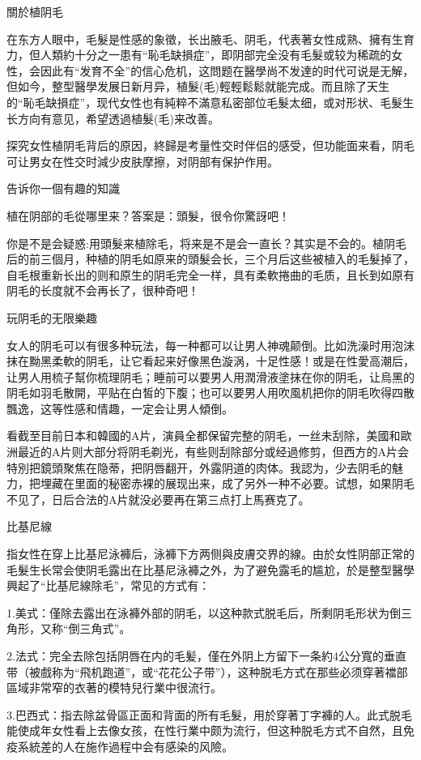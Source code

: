 \documentclass[12pt,UTF8]{ctexbook}
\begin{document}
關於植阴毛

在东方人眼中，毛髮是性感的象徵，长出腋毛、阴毛，代表著女性成熟、擁有生育力，但人類約十分之一患有“恥毛缺損症”，即阴部完全没有毛髮或较为稀疏的女性，会因此有“发育不全”的信心危机，这問题在醫學尚不发達的时代可说是无解，但如今，整型醫學发展日新月异，植髮(毛)輕輕鬆鬆就能完成。而且除了天生的“恥毛缺損症”，现代女性也有純粹不滿意私密部位毛髮太细，或对形状、毛髮生长方向有意见，希望透過植髮(毛)来改善。

探究女性植阴毛背后的原因，終歸是考量性交时伴侣的感受，但功能面来看，阴毛可让男女在性交时減少皮肤摩擦，对阴部有保护作用。

告诉你一個有趣的知識

植在阴部的毛從哪里来？答案是：頭髮，很令你驚訝吧！

你是不是会疑惑:用頭髮来植除毛，将来是不是会一直长？其实是不会的。植阴毛后的前三個月，种植的阴毛如原来的頭髮会长，三个月后这些被植入的毛髮掉了，自毛根重新长出的则和原生的阴毛完全一样，具有柔軟捲曲的毛质，且长到如原有阴毛的长度就不会再长了，很种奇吧！

玩阴毛的无限樂趣

女人的阴毛可以有很多种玩法，每一种都可以让男人神魂颠倒。比如洗澡时用泡沫抹在黝黑柔軟的阴毛，让它看起来好像黑色漩涡，十足性感！或是在性愛高潮后，让男人用梳子幫你梳理阴毛；睡前可以要男人用潤滑液塗抹在你的阴毛，让烏黑的阴毛如羽毛散開，平贴在白皙的下腹；也可以要男人用吹風机把你的阴毛吹得四散飄逸，这等性感和情趣，一定会让男人傾倒。

看截至目前日本和韓國的A片，演員全都保留完整的阴毛，一丝未刮除，美國和歐洲最近的A片则大部分将阴毛剃光，有些则刮除部分或经過修剪，但西方的A片会特別把鏡頭聚焦在隐蒂，把阴唇翻开，外露阴道的肉体。我認为，少去阴毛的魅力，把埋藏在里面的秘密赤裸的展现出来，成了另外一种不必要。试想，如果阴毛不见了，日后合法的A片就没必要再在第三点打上馬赛克了。

比基尼線

指女性在穿上比基尼泳褲后，泳褲下方两侧與皮膚交界的線。由於女性阴部正常的毛髮生长常会使阴毛露出在比基尼泳褲之外，为了避免露毛的尴尬，於是整型醫學興起了“比基尼線除毛”，常见的方式有：

1.美式：僅除去露出在泳褲外部的阴毛，以这种款式脱毛后，所剩阴毛形状为倒三角形，又称“倒三角式”。

2.法式：完全去除包括阴唇在内的毛髪，僅在外阴上方留下一条約4公分寬的垂直带（被戲称为“飛机跑道”，或“花花公子带”），这种脱毛方式在那些必须穿著襠部區域非常窄的衣著的模特兒行業中很流行。

3.巴西式：指去除盆骨區正面和背面的所有毛髮，用於穿著丁字褲的人。此式脱毛能使成年女性看上去像女孩，在性行業中颇为流行，但这种脱毛方式不自然，且免疫系統差的人在施作過程中会有感染的风險。
\end{document}
